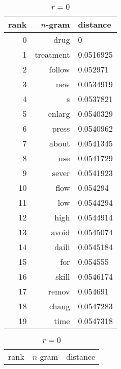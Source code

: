 \begin{table}[t]
    \begin{subtable}[t]{.45\textwidth}
        \centering
        \begin{tabularx}{\textwidth}{r R l}
            \toprule
            rank & $n$-gram & distance\\
            \midrule
            \num{0} & drug & \num{0}\\
            \num{1} & treatment & \num{0.0516925}\\
            \num{2} & follow & \num{0.052971}\\
            \num{3} & new & \num{0.0534919}\\
            \num{4} & s & \num{0.0537821}\\
            \num{5} & enlarg & \num{0.0540329}\\
            \num{6} & press & \num{0.0540962}\\
            \num{7} & about & \num{0.0541345}\\
            \num{8} & use & \num{0.0541729}\\
            \midrule
            \num{9} & sever & \num{0.0541923}\\
            \num{10} & flow & \num{0.054294}\\
            \num{11} & low & \num{0.0544294}\\
            \num{12} & high & \num{0.0544914}\\
            \num{13} & avoid & \num{0.0545074}\\
            \num{14} & daili & \num{0.0545184}\\
            \num{15} & for & \num{0.054555}\\
            \num{16} & skill & \num{0.0546174}\\
            \num{17} & remov & \num{0.054691}\\
            \num{18} & chang & \num{0.0547283}\\
            \num{19} & time & \num{0.0547318}\\
            \bottomrule
        \end{tabularx}
        \caption{$r = 0$}\label{tab:ranking_drug_r0}
    \end{subtable}
    \hfill
    \begin{subtable}[t]{.45\textwidth}
        \centering
        \begin{tabularx}{\textwidth}{r R l}
            \toprule
            rank & $n$-gram & distance\\

\end{tabularx}
\end{subtable}
\end{table}
